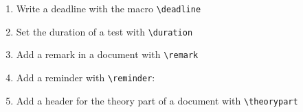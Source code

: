 \documentclass[12pt,a4page]{article}
\def\cellwidth{0.4\textwidth}
\newcommand{\miniexample}[3][t]{%
  \parbox[#1][#3][t]{\cellwidth}{#2}
}
\newcommand{\codeexample}[3][c]{%
  \colorbox[HTML]{b0c4be}{\miniexample[#1]{}{#3}}
}
\newcommand{\textexample}[3][c]{%
  {\footnotesize
    \colorbox[gray]{0.9}{\miniexample[#1]{}{#3}}%
  }
}
\newcommand{\examplerow}[3][10pt]{%
  \par\noindent\strut\hfill\codeexample{#2}{#3}\hspace{#1}\textexample{#2}{#3}\hfill\strut
}
\newlength{\exheight}
\begin{document}
\begin{enumerate}
  We can pass a date using the macros \verb|\setdate| and \verb|\getdate|.
  \examplerow{exampleMacroNameDate03.tex}{\exheight}
\item Write a deadline with the macro \verb|\deadline|
  \setlength{\exheight}{10pt}
  \examplerow{exampleMacroDeadline.tex}{\exheight}
\item Set the duration of a test with \verb|\duration|
  \setlength{\exheight}{33pt}
  \examplerow{exampleMacroDuration.tex}{\exheight}
\item Add a remark in a document with \verb|\remark|
  \setlength{\exheight}{33pt}
  \examplerow{exampleMacroRemark.tex}{\exheight}
\item Add a reminder with \verb|\reminder|:
  \setlength{\exheight}{29pt}
  \examplerow{exampleMacroReminder.tex}{\exheight}
\item Add a header for the theory part of a document with \verb|\theorypart|
  \setlength{\exheight}{32pt}
  \examplerow{exampleMacroTheorypart.tex}{\exheight}


\end{enumerate}
\end{document}
